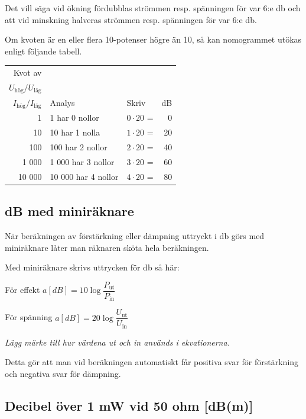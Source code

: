 Det vill säga vid ökning fördubblas strömmen resp. spänningen för var 6:e
\unit{\decibel} och att vid minskning halveras strömmen resp. spänningen för var
6:e \unit{\decibel}.

Om kvoten är en eller flera 10-potenser högre än 10, så kan nomogrammet utökas
enligt följande tabell.

\begin{center}
\begin{tabular}{rllr}
  Kvot av & & & \\
\(U_{\text{hög}}/U_{\text{låg}}\) &          &                  &    \\
\(I_{\text{hög}}/I_{\text{låg}}\) & Analys             & Skriv            & dB \\
  \hline
     1 & 1 har 0 nollor      & \(0 \cdot 20\) = &  0 \\
    10 & 10 har 1 nolla      & \(1 \cdot 20\) = & 20 \\
   100 & 100 har 2 nollor    & \(2 \cdot 20\) = & 40 \\
 1 000 &  1 000 har 3 nollor & \(3 \cdot 20\) = & 60 \\
10 000 & 10 000 har 4 nollor & \(4 \cdot 20\) = & 80
\end{tabular}
\end{center}

\subsection{dB med miniräknare}

När beräkningen av förstärkning eller dämpning uttryckt i \unit{\decibel} görs
med miniräknare låter man räknaren sköta hela beräkningen.

Med miniräknare skrivs uttrycken för \unit{\decibel} så här:

För effekt \(a[dB] = 10\log \dfrac{P_{\text{ut}}}{P_{\text{in}}}\)

För spänning \(a[dB] = 20\log \dfrac{U_{\text{ut}}}{U_{\text{in}}}\)

\emph{Lägg märke till hur värdena ut och in används i ekvationerna.}

Detta gör att man vid beräkningen automatiskt får positiva svar för
förstärkning och negativa svar för dämpning.

\subsection{Decibel över 1 mW vid 50 ohm [dB(m)]}
\label{dBm}

